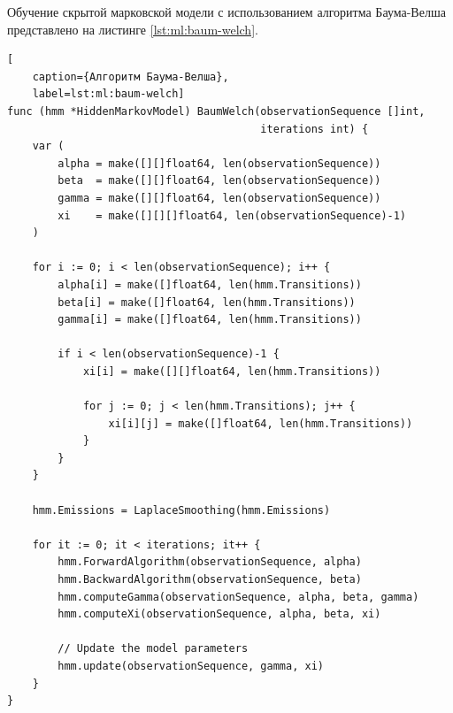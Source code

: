 Обучение скрытой марковской модели с использованием алгоритма Баума-Велша представлено на листинге \ref{lst:ml:baum-welch}.
\begin{lstlisting}[
	caption={Алгоритм Баума-Велша},
	label=lst:ml:baum-welch]
func (hmm *HiddenMarkovModel) BaumWelch(observationSequence []int,
										iterations int) {
	var (
		alpha = make([][]float64, len(observationSequence))
		beta  = make([][]float64, len(observationSequence))
		gamma = make([][]float64, len(observationSequence))
		xi    = make([][][]float64, len(observationSequence)-1)
	)
	
	for i := 0; i < len(observationSequence); i++ {
		alpha[i] = make([]float64, len(hmm.Transitions))
		beta[i] = make([]float64, len(hmm.Transitions))
		gamma[i] = make([]float64, len(hmm.Transitions))
		
		if i < len(observationSequence)-1 {
			xi[i] = make([][]float64, len(hmm.Transitions))
			
			for j := 0; j < len(hmm.Transitions); j++ {
				xi[i][j] = make([]float64, len(hmm.Transitions))
			}
		}
	}
	
	hmm.Emissions = LaplaceSmoothing(hmm.Emissions)
	
	for it := 0; it < iterations; it++ {
		hmm.ForwardAlgorithm(observationSequence, alpha)
		hmm.BackwardAlgorithm(observationSequence, beta)
		hmm.computeGamma(observationSequence, alpha, beta, gamma)
		hmm.computeXi(observationSequence, alpha, beta, xi)
		
		// Update the model parameters
		hmm.update(observationSequence, gamma, xi)
	}
}
\end{lstlisting}


